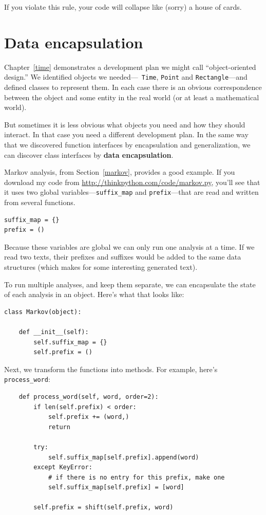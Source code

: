 \documentclass[10pt]{book}
\begin{document}
If you violate this rule, your code will collapse like (sorry)
a house of cards.


\section{Data encapsulation}

Chapter~\ref{time} demonstrates a development plan we might call
``object-oriented design.''  We identified objects we needed---{\tt
  Time}, {\tt Point} and {\tt Rectangle}---and defined classes to
represent them.  In each case there is an obvious correspondence
between the object and some entity in the real world (or at least a
mathematical world).

But sometimes it is less obvious what objects you need
and how they should interact.  In that case you need a different
development plan.  In the same way that we discovered function
interfaces by encapsulation and generalization, we can discover
class interfaces by {\bf data encapsulation}.

Markov analysis, from Section~\ref{markov}, provides a good example.
If you download my code from \url{http://thinkpython.com/code/markov.py},
you'll see that it uses two global variables---\verb"suffix_map" and
\verb"prefix"---that are read and written from several functions.

\begin{verbatim}
suffix_map = {}        
prefix = ()            
\end{verbatim}

Because these variables are global
we can only run one analysis
at a time.  If we read two texts, their prefixes and suffixes would
be added to the same data structures (which makes for some interesting
generated text).

To run multiple analyses, and keep them separate, we can encapsulate
the state of each analysis in an object.
Here's what that looks like:

\begin{verbatim}
class Markov(object):

    def __init__(self):
        self.suffix_map = {}
        self.prefix = ()    
\end{verbatim}

Next, we transform the functions into methods.  For example,
here's \verb"process_word":

\begin{verbatim}
    def process_word(self, word, order=2):
        if len(self.prefix) < order:
            self.prefix += (word,)
            return

        try:
            self.suffix_map[self.prefix].append(word)
        except KeyError:
            # if there is no entry for this prefix, make one
            self.suffix_map[self.prefix] = [word]

        self.prefix = shift(self.prefix, word)        
\end{verbatim}
\end{document}
